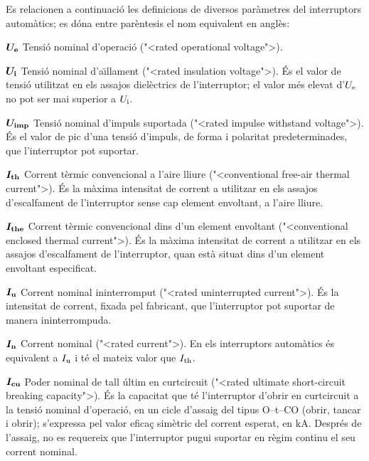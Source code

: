 Es relacionen a continuaci\'{o} les definicions de diversos par\`{a}metres del interruptors autom\`{a}tics; es d\'{o}na entre par\`{e}ntesis el nom equivalent en angl\`{e}s:
\begin{list}{}
   {\setlength{\labelwidth}{10mm} \setlength{\leftmargin}{10mm} \setlength{\labelsep}{2mm}}
   \item[$\boldsymbol{U_\mathrm{e}}$] Tensi\'{o} nominal d'operaci\'{o} ({"<}rated operational voltage{">}).
   \item[$\boldsymbol{U_\mathrm{i}}$] Tensi\'{o} nominal d'a\"{\i}llament ({"<}rated insulation voltage{">}). \'{E}s el valor de tensi\'{o} utilitzat en els assajos diel\`{e}ctrics de l'interruptor;  el valor m\'{e}s elevat d'$U_\mathrm{e}$ no pot ser mai superior a $U_\mathrm{i}$.
    \item[$\boldsymbol{U_\mathrm{imp}}$] Tensi\'{o} nominal d'impuls suportada ({"<}rated impulse withstand voltage{">}). \'{E}s el valor de pic d'una tensi\'{o} d'impuls, de forma i polaritat predeterminades, que l'interruptor pot suportar.
   \item[$\boldsymbol{I_\mathrm{th}}$] Corrent t\`{e}rmic convencional a l'aire lliure ({"<}conventional free-air thermal current{">}).  \'{E}s la  m\`{a}xima intensitat de corrent a utilitzar en els assajos d'escalfament de l'interruptor sense cap element envoltant, a l'aire lliure.
   \item[$\boldsymbol{I_\mathrm{the}}$] Corrent t\`{e}rmic convencional dins d'un element envoltant ({"<}conventional enclosed thermal current{">}).  \'{E}s la m\`{a}xima intensitat de corrent a utilitzar en els assajos d'escalfament de l'interruptor, quan est\`{a} situat dins d'un element envoltant especificat.
    \item[$\boldsymbol{I_\mathrm{u}}$] Corrent nominal ininterromput ({"<}rated uninterrupted current{">}).  \'{E}s la intensitat  de corrent, fixada pel fabricant, que l'interruptor pot suportar de manera ininterrompuda.
    \item[$\boldsymbol{I_\mathrm{n}}$] Corrent nominal ({"<}rated current{">}).  En els interruptors autom\`{a}tics \'{e}s equivalent a $I_\mathrm{u}$ i t\'{e} el mateix valor que $I_\mathrm{th}$.
    \item[$\boldsymbol{I_\mathrm{cu}}$] Poder nominal de tall \'{u}ltim en curtcircuit ({"<}rated ultimate  short-circuit breaking capacity{">}). \'{E}s la capacitat que t\'{e} l'interruptor d'obrir en curtcircuit a la tensi\'{o} nominal d'operaci\'{o}, en un cicle d'assaig del tipus O--t--CO (obrir, tancar i obrir); s'expressa pel valor efica\c{c} sim\`{e}tric del corrent esperat, en kA. Despr\'{e}s de l'assaig, no es requereix que l'interruptor pugui suportar en r\`{e}gim continu el seu corrent nominal.

\end{list}
